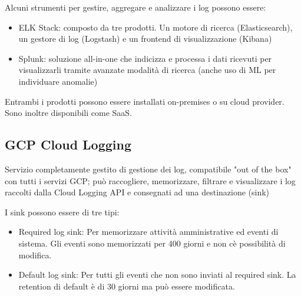 \documentclass[
]{article}
\providecommand{\tightlist}{%
  \setlength{\itemsep}{0pt}\setlength{\parskip}{0pt}}
\begin{document}
{Alcuni strumenti per gestire, aggregare e analizzare i log possono
essere:}

\begin{itemize}
\tightlist
\item
  {ELK Stack}{: composto da tre prodotti. Un motore di ricerca
  (Elasticsearch), un gestore di log (Logstash) e un frontend di
  visualizzazione (Kibana) }
\end{itemize}

{}

\begin{itemize}
\tightlist
\item
  {Splunk}{: soluzione all-in-one che indicizza e processa i dati
  ricevuti per visualizzarli tramite avanzate modalità di ricerca (anche
  uso di ML per individuare anomalie)}
\end{itemize}

{}

{Entrambi i prodotti possono essere installati on-premises o su cloud
provider. Sono inoltre disponibili come SaaS.}

{}

\subsection{\texorpdfstring{{GCP Cloud
Logging}}{GCP Cloud Logging}}\label{h.zbqe733kxjd5}

{Servizio completamente gestito di gestione dei log, compatibile "out of
the box" con tutti i servizi GCP; può raccogliere, memorizzare, filtrare
e visualizzare i log raccolti dalla Cloud Logging API e consegnati ad
una destinazione (sink)}

{}

{I sink possono essere di tre tipi:}

\begin{itemize}
\tightlist
\item
  {Required log sink}{: Per memorizzare attività amministrative ed
  eventi di sistema. Gli eventi sono memorizzati per 400 giorni e non
  c\textquotesingle è possibilità di modifica.}
\end{itemize}

{}

\begin{itemize}
\tightlist
\item
  {Default log sink}{: Per tutti gli eventi che non sono inviati al
  required sink. La retention di default è di 30 giorni ma può essere
  modificata.}
\end{itemize}
\end{document}
